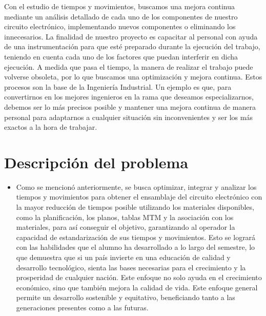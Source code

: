 \begin{itemize}
    Con el estudio de tiempos y movimientos, buscamos una mejora continua mediante un análisis detallado de cada uno de los componentes de nuestro circuito electrónico, implementando nuevos componentes o eliminando los innecesarios. La finalidad de nuestro proyecto es capacitar al personal con ayuda de una instrumentación para que esté preparado durante la ejecución del trabajo, teniendo en cuenta cada uno de los factores que puedan interferir en dicha ejecución. A medida que pasa el tiempo, la manera de realizar el trabajo puede volverse obsoleta, por lo que buscamos una optimización y mejora continua. Estos procesos son la base de la Ingeniería Industrial. Un ejemplo es que, para convertirnos en los mejores ingenieros en la rama que deseamos especializarnos, debemos ser lo más precisos posible y mantener una mejora continua de manera personal para adaptarnos a cualquier situación sin inconvenientes y ser los más exactos a la hora de trabajar.
    
    \cite{optimización}
    \end{itemize}
    
    \section{Descripción del problema}
    \begin{itemize}
        \item Como se mencionó anteriormente, se busca optimizar, integrar y analizar los tiempos y movimientos para obtener el ensamblaje del circuito electrónico con la mayor reducción de tiempos posible utilizando los materiales disponibles, como la planificación, los planos, tablas MTM y la asociación con los materiales, para así conseguir el objetivo, garantizando al operador la capacidad de estandarización de sus tiempos y movimientos. Esto se logrará con las habilidades que el alumno ha desarrollado a lo largo del semestre, lo que demuestra que si un país invierte en una educación de calidad y desarrollo tecnológico, sienta las bases necesarias para el crecimiento y la prosperidad de cualquier nación. Este enfoque no solo ayuda en el crecimiento económico, sino que también mejora la calidad de vida. Este enfoque general permite un desarrollo sostenible y equitativo, beneficiando tanto a las generaciones presentes como a las futuras.
        \cite{ensamblaje}
    \end{itemize}
         
